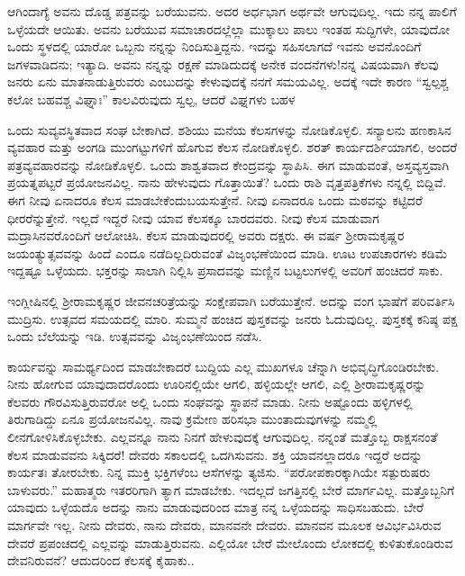 ಆಗಿಂದಾಗ್ಯೆ\enginline{-} ಅವನು ದೊಡ್ಡ ಪತ್ರವನ್ನು ಬರೆಯುವನು. ಅದರ ಅರ್ಧಭಾಗ ಅರ್ಥವೇ ಆಗುವುದಿಲ್ಲ. ಇದು ನನ್ನ ಪಾಲಿಗೆ ಒಳ್ಳೆಯದೇ ಆಯಿತು. ಅವನು ಬರೆಯುವ ಸಮಾಚಾರದಲ್ಲೆಲ್ಲಾ ಮುಕ್ಕಾಲು ಪಾಲು ಇಂತಹ ಸುದ್ದಿಗಳೇ, ಯಾವುದೋ ಒಂದು ಸ್ಥಳದಲ್ಲಿ ಯಾರೋ ಒಬ್ಬನು ನನ್ನನ್ನು ನಿಂದಿಸುತ್ತಿದ್ದನು. ಇದನ್ನು ಸಹಿಸಲಾಗದೆ ಇವನು ಅವನೊಂದಿಗೆ ಜಗಳವಾಡಿದನು; ಇತ್ಯಾದಿ. ಅವನು ನನ್ನನ್ನು ರಕ್ಷಣೆ ಮಾಡಿದುದಕ್ಕೆ ಅನೇಕ ವಂದನೆಗಳು!ನನ್ನ ವಿಷಯವಾಗಿ ಕೆಲವು ಜನರು ಏನು ಮಾತನಾಡುತ್ತಿರುವರು ಎಂಬುದನ್ನು ಕೇಳುವುದಕ್ಕೆ ನನಗೆ ಸಮಯವಿಲ್ಲ. ಅದಕ್ಕೆ ಇದೇ ಕಾರಣ\enginline{-} “ಸ್ವಲ್ಪಶ್ಚ ಕಲೋ ಬಹವಶ್ಚ ವಿಘ್ನಾಃ” ಕಾಲವಿರುವುದು ಸ್ವಲ್ಪ, ಆದರೆ ವಿಘ್ನಗಳು ಬಹಳ

ಒಂದು ಸುವ್ಯವಸ್ಥಿತವಾದ ಸಂಘ ಬೇಕಾಗಿದೆ. ಶಶಿಯು ಮನೆಯ ಕೆಲಸಗಳನ್ನು ನೋಡಿಕೊಳ್ಳಲಿ. ಸನ್ಯಾಲನು ಹಣಕಾಸಿನ ವ್ಯವಹಾರ ಮತ್ತು ಅಂಗಡಿ ಮುಂಗಟ್ಟುಗಳಿಗೆ ಹೊಗುವ ಕೆಲಸ ನೋಡಿಕೊಳ್ಳಲಿ. ಶರತ್ ಕಾರ್ಯದರ್ಶಿಯಾಗಲಿ, ಅಂದರೆ ಪತ್ರವ್ಯವಹಾರವನ್ನು ನೋಡಿಕೊಳ್ಳಲಿ. ಒಂದು ಶಾಶ್ವತವಾದ ಕೇಂದ್ರವನ್ನು ಸ್ಥಾಪಿಸಿ. ಈಗ ಮಾಡುವಂತೆ, ಅಸ್ತವ್ಯಸ್ತವಾಗಿ ಪ್ರಯತ್ನಪಟ್ಟರೆ ಪ್ರಯೋಜನವಿಲ್ಲ. ನಾನು ಹೇಳುವುದು ಗೊತ್ತಾಯಿತೆ? ಒಂದು ರಾಶಿ ವೃತ್ತಪತ್ರಿಕೆಗಳು ನನ್ನಲ್ಲಿ ಬಿದ್ದಿವೆ. ಈಗ ನೀವು ಏನಾದರೂ ಕೆಲಸ ಮಾಡಬೇಕೆಂದು\break ಬಯಸುತ್ತೇನೆ. ನೀವು ಏನಾದರೂ ಒಂದು ಮಠವನ್ನು ಕಟ್ಟಿದರೆ ಧೀರರೆನ್ನುತ್ತೇನೆ. ಇಲ್ಲದೆ ಇದ್ದರೆ ನೀವು ಯಾವ ಕೆಲಸಕ್ಕೂ ಬಾರದವರು. ನೀವು ಕೆಲಸ ಮಾಡುವಾಗ ಮದ್ರಾಸಿ\break ನವರೊಂದಿಗೆ ಆಲೋಚಿಸಿ. ಕೆಲಸ ಮಾಡುವುದರಲ್ಲಿ ಅವರು ದಕ್ಷರು. ಈ ವರ್ಷ ಶ‍್ರೀರಾಮಕೃಷ್ಣರ ಜಯಂತ್ಯುತ್ಸವವನ್ನು ಹಿಂದೆ ಎಂದೂ ನಡೆದಿಲ್ಲದಿರುವಂತೆ ವಿಜೃಂಭಣೆಯಿಂದ ಮಾಡಿ. ಊಟ ಉಪಚಾರಗಳು ಕಡಿಮೆ ಇದ್ದಷ್ಟೂ ಒಳ್ಳೆಯದು. ಭಕ್ತರನ್ನು ಸಾಲಾಗಿ ನಿಲ್ಲಿಸಿ ಪ್ರಸಾದವನ್ನು ಮಣ್ಣಿನ ಬಟ್ಟಲುಗಳಲ್ಲಿ ಅವರಿಗೆ ಹಂಚಿದರೆ ಸಾಕು.

ಇಂಗ್ಲೀಷಿನಲ್ಲಿ ಶ‍್ರೀರಾಮಕೃಷ್ಣರ ಜೀವನಚರಿತ್ರೆಯನ್ನು ಸಂಕ್ಷೇಪವಾಗಿ ಬರೆಯುತ್ತೇನೆ. ಅದನ್ನು ವಂಗ ಭಾಷೆಗೆ ಪರಿವರ್ತಿಸಿ ಮುದ್ರಿಸು. ಉತ್ಸವದ ಸಮಯದಲ್ಲಿ ಮಾರಿ. ಸುಮ್ಮನೆ ಹಂಚಿದ ಪುಸ್ತಕವನ್ನು ಜನರು ಓದುವುದಿಲ್ಲ. ಪುಸ್ತಕಕ್ಕೆ ಕನಿಷ್ಠ ಪಕ್ಷ ಒಂದು ಬೆಲೆಯನ್ನು ಇಡಿ. ಉತ್ಸವವನ್ನು ವಿಜೃಂಭಣೆಯಿಂದ ನಡೆಸಿ.

ಕಾರ್ಯವನ್ನು ಸಾಮರ್ಥ್ಯದಿಂದ ಮಾಡಬೇಕಾದರೆ ಬುದ್ದಿಯ ಎಲ್ಲ ಮುಖಗಳೂ ಚೆನ್ನಾಗಿ ಅಭಿವೃದ್ಧಿಗೊಂಡಿರಬೇಕು. ನೀನು ಹೋಗುವ ಯಾವುದಾದರೊಂದು ಊರಿನಲ್ಲಿಯೇ ಆಗಲಿ, ಹಳ್ಳಿಯಲ್ಲೇ ಆಗಲಿ, ಎಲ್ಲಿ ಶ‍್ರೀರಾಮಕೃಷ್ಣರನ್ನು ಕೆಲವರು ಗೌರವಿಸುತ್ತಿರುವರೋ ಅಲ್ಲಿ ಒಂದು ಸಂಘವನ್ನು ಸ್ಥಾಪನೆ ಮಾಡು. ನೀನು ಅಷ್ಟೊಂದು ಹಳ್ಳಿಗಳಲ್ಲಿ ತಿರುಗಾಡಿದ್ದು ಏನೂ ಪ್ರಯೋಜನವಿಲ್ಲ. ನಾವು ಕ್ರಮೇಣ ಹರಿಸಭಾ ಮುಂತಾದುವುಗಳನ್ನು ನಮ್ಮಲ್ಲಿ ಲೀನಗೋಳಿಸಿಕೊಳ್ಳಬೇಕು. ಎಲ್ಲವನ್ನೂ ನಾನು ನಿನಗೆ ಹೇಳುವುದಕ್ಕೆ ಆಗುವುದಿಲ್ಲ. ನನ್ನಂತೆ ಮತ್ತೊಬ್ಬ ರಾಕ್ಷಸನಂತೆ ಕೆಲಸ ಮಾಡುವವನು ಸಿಕ್ಕಿದರೆ! ದೇವರು ಸಕಾಲದಲ್ಲಿ ಒದಗಿಸುವನು. ಶಕ್ತಿ ಯಾವನಲ್ಲಾದರೂ ಇದ್ದರೆ ಅದನ್ನು ಕಾರ್ಯತಃ ತೋರಬೇಕು. ನಿನ್ನ ಮುಕ್ತಿ ಭಕ್ತಿಗಳೆಂಬ ಆಸೆಗಳನ್ನು ತ್ಯಜಿಸು. ``ಪರೋಪಕಾರಕ್ಕಾಗಿಯೇ ಸತ್ಪುರುಷರು ಬಾಳುವರು.” ಮಹಾತ್ಮರು ಇತರರಿಗಾಗಿ ತ್ಯಾಗ ಮಾಡಬೇಕು. ಇದಲ್ಲದೆ ಜಗತ್ತಿನಲ್ಲಿ ಬೇರೆ ಮಾರ್ಗವಿಲ್ಲ. ಮತ್ತೊಬ್ಬನಿಗೆ ಯಾವುದು ಒಳ್ಳೆಯದೊ ಅದನ್ನು ನಾನು ಮಾಡುವುದರಿಂದ ಮಾತ್ರ ನನ್ನ ಒಳ್ಳೆಯದನ್ನು ಸಾಧಿಸಬಹುದು. ಬೇರೆ ಮಾರ್ಗವೇ ಇಲ್ಲ. ನೀನು ದೇವರು, ನಾನು ದೇವರು, ಮಾನವನೇ ದೇವರು. ಮಾನವನ ಮೂಲಕ ಆವಿರ್ಭವಿಸಿರುವ ದೇವರೆ ಪ್ರಪಂಚದಲ್ಲಿ ಎಲ್ಲವನ್ನು ಮಾಡುತ್ತಿರುವನು. ಎಲ್ಲಿಯೋ ಬೇರೆ ಮೇಲೊಂದು ಲೋಕದಲ್ಲಿ ಕುಳಿತುಕೊಂಡಿರುವ ದೇವನಿರುವನೆ? ಆದುದರಿಂದ ಕೆಲಸಕ್ಕೆ ಕೈಹಾಕು..

